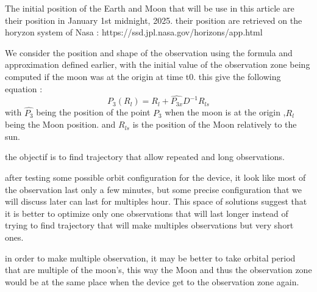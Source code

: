 \documentclass{article} %
\begin{document}
		The initial position of the Earth and Moon that will be use in this article are their position in January 1st midnight, 2025. their position are retrieved on the horyzon system of Nasa : https://ssd.jpl.nasa.gov/horizons/app.html
		
		
		
		We consider the position and shape of the observation using the formula and approximation defined earlier, with the initial value of the observation zone being computed if the moon was at the origin at time t0.
		this give the following equation :
		$$
		P_3(R_l)=R_{l}+\hat{P_{3x}}D^{-1}R_{ls}
		$$
		with $\hat{P_3}$ being the position of the point $P_3$ when the moon is at the origin
		,$R_{l}$ being the Moon position.
		and $R_{ls}$ is the position of the Moon relatively to the sun.
		
		the objectif is to find trajectory that allow repeated and long observations.
		
		
		after testing some possible orbit configuration for the device, it look like most of the observation last only a few minutes, but some precise configuration that we will discuss later can last for multiples hour. This space of solutions suggest that it is better to optimize only one observations that will last longer instead of trying to find trajectory that will make multiples observations but very short ones.
		
		
		
		
		
		in order to make multiple observation, it may be better to take orbital period that are multiple of the moon's, this way the Moon and thus the observation zone would be at the same place when the device get to the observation zone again.
		
\end{document}
